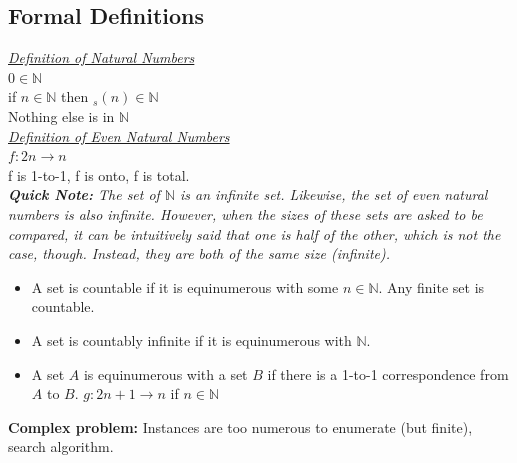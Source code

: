 \documentclass[12pt,a4paper]{article}
\begin{document}
\subsection{Formal Definitions}
\textit{\underline{Definition of Natural Numbers}}\\
$0 \in \mathbb{N}$\\
if $n \in \mathbb{N}$ then $_{s}(n) \in \mathbb{N}$\\
Nothing else is in $\mathbb{N}$\\

\noindent \textit{\underline{Definition of Even Natural Numbers}}\\
$f: 2n \rightarrow n$\\
f is 1-to-1,
f is onto,
f is total.\\

\textit{\textbf{Quick Note:} The set of $\mathbb{N}$ is an infinite set. Likewise, the set of even natural numbers is also infinite. However, when the sizes of these sets are asked to be compared, it can be intuitively said that one is half of the other, which is not the case, though. Instead, they are both of the same size (infinite).}\\
\begin{itemize}
\item A set is countable if it is equinumerous with some $n \in \mathbb{N}$. Any finite set is countable.
\item A set is countably infinite if it is equinumerous with $\mathbb{N}$.
\item A set $A$ is equinumerous with a set $B$ if there is a 1-to-1 correspondence from $A$ to $B$. $g: 2n+1 \rightarrow n$ if $n \in \mathbb{N}$
\end{itemize} 

\noindent \textbf{Complex problem:} Instances are too numerous to enumerate (but finite), search algorithm.
\end{document}

